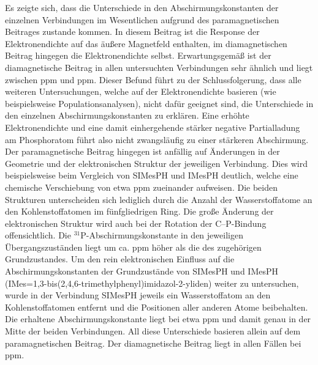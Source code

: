\FloatBarrier
\newpage
Es zeigte sich, dass die Unterschiede in den Abschirmungskonstanten der einzelnen Verbindungen im Wesentlichen aufgrund des paramagnetischen Beitrages zustande kommen. In diesem Beitrag ist die Response der Elektronendichte auf das äußere Magnetfeld enthalten, im diamagnetischen Beitrag hingegen die Elektronendichte selbst. Erwartungsgemäß ist der diamagnetische Beitrag in allen untersuchten Verbindungen sehr ähnlich und liegt zwischen \unit[960]{ppm} und \unit[967]{ppm}. Dieser Befund führt zu der Schlussfolgerung, dass alle weiteren Untersuchungen, welche auf der Elektronendichte basieren (wie beispielsweise Populationsanalysen), nicht dafür geeignet sind, die Unterschiede in den einzelnen Abschirmungskonstanten zu erklären. Eine erhöhte Elektronendichte und eine damit einhergehende stärker negative Partialladung am Phosphoratom führt also nicht zwangsläufig zu einer stärkeren Abschirmung. Der paramagnetische Beitrag hingegen ist anfällig auf Änderungen in der Geometrie und der elektronischen Struktur der jeweiligen Verbindung. Dies wird beispielsweise beim Vergleich von SIMesPH und IMesPH deutlich, welche eine chemische Verschiebung von etwa \unit[20]{ppm} zueinander aufweisen. Die beiden Strukturen unterscheiden sich lediglich durch die Anzahl der Wasserstoffatome an den Kohlenstoffatomen im fünfgliedrigen Ring. Die große Änderung der elektronischen Struktur wird auch bei der Rotation der C--P-Bindung offensichtlich. Die $^{31}$P-Abschirmungskonstante in den jeweiligen Übergangszuständen liegt um ca. \unit[60]{ppm} höher als die des zugehörigen Grundzustandes. Um den rein elektronischen Einfluss auf die Abschirmungskonstanten der Grundzustände von SIMesPH und IMesPH (IMes=1,3-bis(2,4,6-tri\-me\-thyl\-phe\-nyl)imi\-da\-zol-2-yli\-den) weiter zu untersuchen, wurde in der Verbindung SIMesPH jeweils ein Wasserstoffatom an den Kohlenstoffatomen entfernt und die Positionen aller anderen Atome beibehalten. Die erhaltene Abschirmungskonstante liegt bei etwa \unit[444]{ppm} und damit genau in der Mitte der beiden Verbindungen. All diese Unterschiede basieren allein auf dem paramagnetischen Beitrag. Der diamagnetische Beitrag liegt in allen Fällen bei \unit[962]{ppm}.

